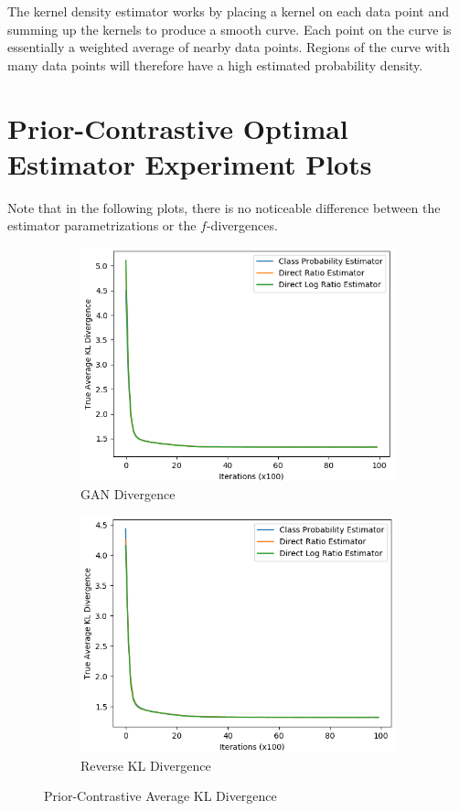 \documentclass[honours,12pt, twoside]{unswthesis}
\numberwithin{equation}{section}
\theoremstyle{definition}
\begin{document}
The kernel density estimator works by placing a kernel on each data point and summing up the kernels to produce a smooth curve. Each point on the curve is essentially a weighted average of nearby data points. Regions of the curve with many data points will therefore have a high estimated probability density.
\chapter{Prior-Contrastive Optimal Estimator Experiment Plots}\label{app:E}
\small Note that in the following plots, there is no noticeable difference between the estimator parametrizations or the $f$-divergences.
\begin{figure}[h]
\centering
\begin{subfigure}{0.33\textwidth}
\centering
\includegraphics[width=\linewidth]{truklmins/PCADVvsPCADVexpvsPCADVgudlog.png}
\caption{GAN Divergence}
\end{subfigure}
\begin{subfigure}{0.33\textwidth}
\centering
\includegraphics[width=\linewidth]{truklmins/PCKLDvsPCKLexpvsPCKLgudlog.png}
\caption{Reverse KL Divergence}
\end{subfigure}
\caption{Prior-Contrastive Average KL Divergence}
\end{figure}
\end{document}
